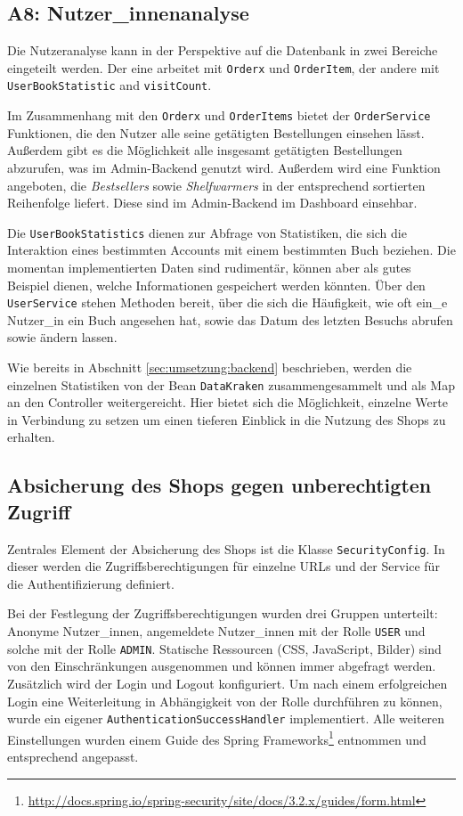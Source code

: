 	\subsection{A8: Nutzer\_innenanalyse}\label{sec:umsetzung:analyse}
	Die Nutzeranalyse kann in der Perspektive auf die Datenbank in zwei Bereiche eingeteilt werden. Der eine arbeitet mit \texttt{Orderx} und \texttt{OrderItem}, der andere mit \texttt{User\-Book\-Statistic} and \texttt{visitCount}.
	
	Im Zusammenhang mit den \texttt{Orderx} und \texttt{OrderItems} bietet der \texttt{OrderService} Funktionen, die den Nutzer alle seine getätigten Bestellungen einsehen lässt. Außerdem gibt es die Möglichkeit alle insgesamt getätigten Bestellungen abzurufen, was im Admin-Backend genutzt wird. Außerdem wird eine Funktion angeboten, die \textit{Bestsellers} sowie \textit{Shelfwarmers} in der entsprechend sortierten Reihenfolge liefert. Diese sind im Admin-Backend im Dashboard einsehbar.
	
	Die \texttt{UserBookStatistics} dienen zur Abfrage von Statistiken, die sich die Interaktion eines bestimmten Accounts mit einem bestimmten Buch beziehen. Die momentan implementierten Daten sind rudimentär, können aber als gutes Beispiel dienen, welche Informationen gespeichert werden könnten. Über den \texttt{UserService} stehen Methoden bereit, über die sich die Häufigkeit, wie oft ein\_e Nutzer\_in ein Buch angesehen hat, sowie das Datum des letzten Besuchs abrufen sowie ändern lassen.
	
	Wie bereits in Abschnitt \ref{sec:umsetzung:backend} beschrieben, werden die einzelnen Statistiken von der Bean \lstinline|DataKraken| zusammengesammelt und als Map an den Controller weitergereicht. Hier bietet sich die Möglichkeit, einzelne Werte in Verbindung zu setzen um einen tieferen Einblick in die Nutzung des Shops zu erhalten.
	
	\subsection{Absicherung des Shops gegen unberechtigten Zugriff}
	Zentrales Element der Absicherung des Shops ist die Klasse \lstinline|SecurityConfig|. In dieser werden die Zugriffsberechtigungen für einzelne URLs und der Service für die Authentifizierung definiert.
	
	Bei der Festlegung der Zugriffsberechtigungen wurden drei Gruppen unterteilt: Anonyme Nutzer\_innen, angemeldete Nutzer\_innen mit der Rolle \lstinline|USER| und solche mit der Rolle \lstinline|ADMIN|. Statische Ressourcen (CSS, JavaScript, Bilder) sind von den Einschränkungen ausgenommen und können immer abgefragt werden. Zusätzlich wird der Login und Logout konfiguriert. Um nach einem erfolgreichen Login eine Weiterleitung in Abhängigkeit von der Rolle durchführen zu können, wurde ein eigener \lstinline|AuthenticationSuccessHandler| implementiert. Alle weiteren Einstellungen wurden einem Guide des Spring Frameworks\footnote{\hyperlink{http://docs.spring.io/spring-security/site/docs/3.2.x/guides/form.html}{http://docs.spring.io/spring-security/site/docs/3.2.x/guides/form.html}} entnommen und entsprechend angepasst.
	
